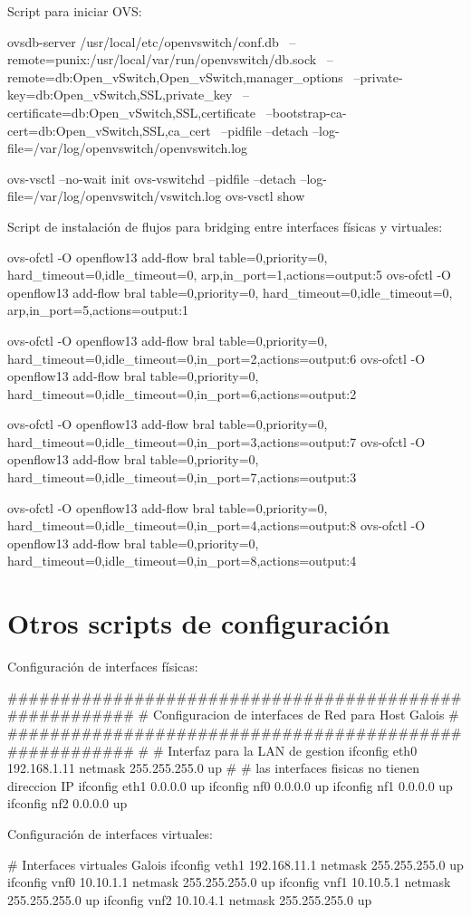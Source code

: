 \newpage
Script para iniciar OVS:
\begin{bash}
ovsdb-server /usr/local/etc/openvswitch/conf.db \
--remote=punix:/usr/local/var/run/openvswitch/db.sock \
--remote=db:Open_vSwitch,Open_vSwitch,manager_options \
--private-key=db:Open_vSwitch,SSL,private_key \
--certificate=db:Open_vSwitch,SSL,certificate \
--bootstrap-ca-cert=db:Open_vSwitch,SSL,ca_cert \
--pidfile --detach 
--log-file=/var/log/openvswitch/openvswitch.log

ovs-vsctl --no-wait init
ovs-vswitchd --pidfile --detach 
--log-file=/var/log/openvswitch/vswitch.log
ovs-vsctl show

\end{bash}
\vspace{1cm}
Script de instalaci\'on de flujos para bridging entre interfaces f\'isicas y virtuales:
\begin{bash}
ovs-ofctl -O openflow13 add-flow bral table=0,priority=0,
hard_timeout=0,idle_timeout=0, arp,in_port=1,actions=output:5
ovs-ofctl -O openflow13 add-flow bral table=0,priority=0,
hard_timeout=0,idle_timeout=0, arp,in_port=5,actions=output:1

ovs-ofctl -O openflow13 add-flow bral table=0,priority=0,
hard_timeout=0,idle_timeout=0,in_port=2,actions=output:6
ovs-ofctl -O openflow13 add-flow bral table=0,priority=0,
hard_timeout=0,idle_timeout=0,in_port=6,actions=output:2

ovs-ofctl -O openflow13 add-flow bral table=0,priority=0,
hard_timeout=0,idle_timeout=0,in_port=3,actions=output:7
ovs-ofctl -O openflow13 add-flow bral table=0,priority=0,
hard_timeout=0,idle_timeout=0,in_port=7,actions=output:3

ovs-ofctl -O openflow13 add-flow bral table=0,priority=0,
hard_timeout=0,idle_timeout=0,in_port=4,actions=output:8
ovs-ofctl -O openflow13 add-flow bral table=0,priority=0,
hard_timeout=0,idle_timeout=0,in_port=8,actions=output:4
\end{bash}

\newpage
\section{Otros scripts de configuraci\'on}

Configuraci\'on de interfaces f\'isicas:
\begin{bash}

#######################################################
# Configuracion de interfaces de Red para Host Galois #
#######################################################
#
# Interfaz para la LAN de gestion
ifconfig eth0 192.168.1.11 netmask 255.255.255.0 up
#
# las interfaces fisicas no tienen direccion IP
ifconfig eth1 0.0.0.0 up
ifconfig nf0 0.0.0.0 up
ifconfig nf1 0.0.0.0 up
ifconfig nf2 0.0.0.0 up

\end{bash}
\vspace{1cm}
Configuraci\'on de interfaces virtuales:
\begin{bash}
# Interfaces virtuales Galois 
ifconfig veth1 192.168.11.1 netmask 255.255.255.0 up
ifconfig vnf0 10.10.1.1 netmask 255.255.255.0 up
ifconfig vnf1 10.10.5.1 netmask 255.255.255.0 up
ifconfig vnf2 10.10.4.1 netmask 255.255.255.0 up
\end{bash}
